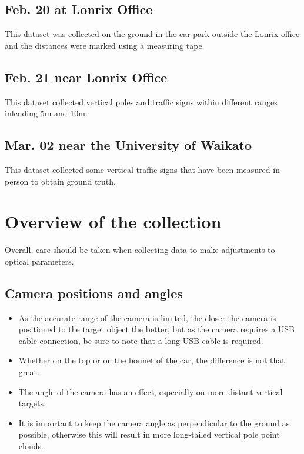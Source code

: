 \subsection{Feb. 20 at Lonrix Office}

This dataset was collected on the ground in the car park outside the Lonrix office and the distances were marked using a measuring tape.

\subsection{Feb. 21 near Lonrix Office}

This dataset collected vertical poles and traffic signs within different ranges inlcuding 5m and 10m. 

\subsection{Mar. 02 near the University of Waikato}

This dataset collected some vertical traffic signs that have been measured in person to obtain ground truth.

\section{Overview of the collection}

Overall, care should be taken when collecting data to make adjustments to optical parameters. 

\subsection{Camera positions and angles}

\renewcommand{\labelitemi}{$\blacksquare$}
\begin{itemize}     
    \item As the accurate range of the camera is limited, the closer the camera is positioned to the target object the better, but as the camera requires a USB cable connection, be sure to note that a long USB cable is required.

    \item Whether on the top or on the bonnet of the car, the difference is not that great.
    
    \item The angle of the camera has an effect, especially on more distant vertical targets.
    
    \item It is important to keep the camera angle as perpendicular to the ground as possible, otherwise this will result in more long-tailed vertical pole point clouds.
\end{itemize}

